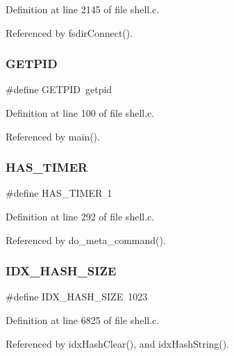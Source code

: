 Definition at line 2145 of file shell.\+c.



Referenced by fsdir\+Connect().

\mbox{\label{shell_8c_a7619c450d37a313aec4406af35c363ac}} 
\subsubsection{G\+E\+T\+P\+ID}
{\footnotesize\ttfamily \#define G\+E\+T\+P\+ID~getpid}



Definition at line 100 of file shell.\+c.



Referenced by main().

\mbox{\label{shell_8c_a492513c85e12ae5f4901790665a0c3ab}} 
\subsubsection{H\+A\+S\+\_\+\+T\+I\+M\+ER}
{\footnotesize\ttfamily \#define H\+A\+S\+\_\+\+T\+I\+M\+ER~1}



Definition at line 292 of file shell.\+c.



Referenced by do\+\_\+meta\+\_\+command().

\mbox{\label{shell_8c_a6bdcdbc303f556b7c59c1828778bca73}} 
\subsubsection{I\+D\+X\+\_\+\+H\+A\+S\+H\+\_\+\+S\+I\+ZE}
{\footnotesize\ttfamily \#define I\+D\+X\+\_\+\+H\+A\+S\+H\+\_\+\+S\+I\+ZE~1023}



Definition at line 6825 of file shell.\+c.



Referenced by idx\+Hash\+Clear(), and idx\+Hash\+String().

\mbox{\label{shell_8c_af999dd7bfc5e1f15156fbf37db231280}} 
